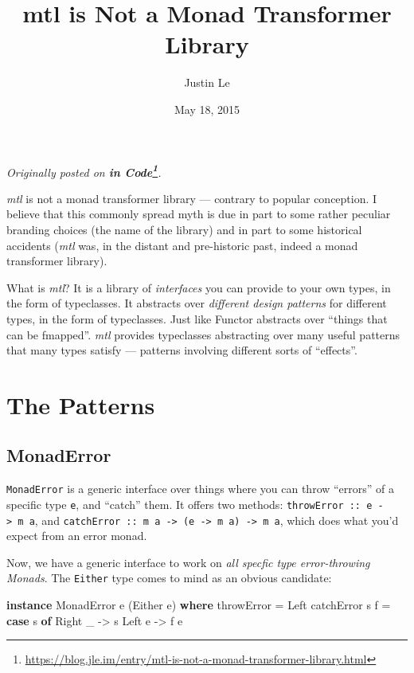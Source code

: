 \documentclass[]{article}
\title{mtl is Not a Monad Transformer Library}
\author{Justin Le}
\date{May 18, 2015}
\newenvironment{Shaded}{}{}
\newcommand{\DataTypeTok}[1]{\textcolor[rgb]{0.56,0.13,0.00}{#1}}
\newcommand{\FunctionTok}[1]{\textcolor[rgb]{0.02,0.16,0.49}{#1}}
\newcommand{\KeywordTok}[1]{\textcolor[rgb]{0.00,0.44,0.13}{\textbf{#1}}}
\newcommand{\NormalTok}[1]{#1}
\newcommand{\OtherTok}[1]{\textcolor[rgb]{0.00,0.44,0.13}{#1}}
\renewcommand{\href}[2]{#2\footnote{\url{#1}}}
\begin{document}
\maketitle

\emph{Originally posted on
\textbf{\href{https://blog.jle.im/entry/mtl-is-not-a-monad-transformer-library.html}{in
Code}}.}

\emph{mtl} is not a monad transformer library --- contrary to popular
conception. I believe that this commonly spread myth is due in part to some
rather peculiar branding choices (the name of the library) and in part to some
historical accidents (\emph{mtl} was, in the distant and pre-historic past,
indeed a monad transformer library).

What is \emph{mtl}? It is a library of \emph{interfaces} you can provide to your
own types, in the form of typeclasses. It abstracts over \emph{different design
patterns} for different types, in the form of typeclasses. Just like Functor
abstracts over ``things that can be fmapped''. \emph{mtl} provides typeclasses
abstracting over many useful patterns that many types satisfy --- patterns
involving different sorts of ``effects''.

\hypertarget{the-patterns}{%
\section{The Patterns}\label{the-patterns}}

\hypertarget{monaderror}{%
\subsection{MonadError}\label{monaderror}}

\texttt{MonadError} is a generic interface over things where you can throw
``errors'' of a specific type \texttt{e}, and ``catch'' them. It offers two
methods: \texttt{throwError\ ::\ e\ -\textgreater{}\ m\ a}, and
\texttt{catchError\ ::\ m\ a\ -\textgreater{}\ (e\ -\textgreater{}\ m\ a)\ -\textgreater{}\ m\ a},
which does what you'd expect from an error monad.

Now, we have a generic interface to work on \emph{all specfic type
error-throwing Monads}. The \texttt{Either} type comes to mind as an obvious
candidate:

\begin{Shaded}
\begin{Highlighting}[]
\KeywordTok{instance} \DataTypeTok{MonadError}\NormalTok{ e (}\DataTypeTok{Either}\NormalTok{ e) }\KeywordTok{where}
\NormalTok{    throwError }\FunctionTok{=} \DataTypeTok{Left}
\NormalTok{    catchError s f }\FunctionTok{=} \KeywordTok{case}\NormalTok{ s }\KeywordTok{of}
                       \DataTypeTok{Right}\NormalTok{ _ }\OtherTok{->}\NormalTok{ s}
                       \DataTypeTok{Left}\NormalTok{ e  }\OtherTok{->}\NormalTok{ f e}
\end{Highlighting}
\end{Shaded}
\end{document}
